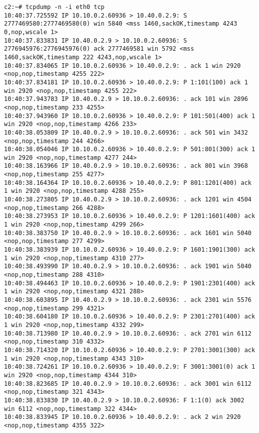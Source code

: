 \documentclass[a4paper,12pt]{article}
\begin{document}
\begin{Verbatim}
c2:~# tcpdump -n -i eth0 tcp
10:40:37.725592 IP 10.10.0.2.60936 > 10.40.0.2.9: S 2777469580:2777469580(0) win 5840 <mss 1460,sackOK,timestamp 4243 0,nop,wscale 1>
10:40:37.833831 IP 10.40.0.2.9 > 10.10.0.2.60936: S 2776945976:2776945976(0) ack 2777469581 win 5792 <mss 1460,sackOK,timestamp 222 4243,nop,wscale 1>
10:40:37.834065 IP 10.10.0.2.60936 > 10.40.0.2.9: . ack 1 win 2920 <nop,nop,timestamp 4255 222>
10:40:37.834181 IP 10.10.0.2.60936 > 10.40.0.2.9: P 1:101(100) ack 1 win 2920 <nop,nop,timestamp 4255 222>
10:40:37.943783 IP 10.40.0.2.9 > 10.10.0.2.60936: . ack 101 win 2896 <nop,nop,timestamp 233 4255>
10:40:37.943960 IP 10.10.0.2.60936 > 10.40.0.2.9: P 101:501(400) ack 1 win 2920 <nop,nop,timestamp 4266 233>
10:40:38.053809 IP 10.40.0.2.9 > 10.10.0.2.60936: . ack 501 win 3432 <nop,nop,timestamp 244 4266>
10:40:38.054046 IP 10.10.0.2.60936 > 10.40.0.2.9: P 501:801(300) ack 1 win 2920 <nop,nop,timestamp 4277 244>
10:40:38.163966 IP 10.40.0.2.9 > 10.10.0.2.60936: . ack 801 win 3968 <nop,nop,timestamp 255 4277>
10:40:38.164364 IP 10.10.0.2.60936 > 10.40.0.2.9: P 801:1201(400) ack 1 win 2920 <nop,nop,timestamp 4288 255>
10:40:38.273805 IP 10.40.0.2.9 > 10.10.0.2.60936: . ack 1201 win 4504 <nop,nop,timestamp 266 4288>
10:40:38.273953 IP 10.10.0.2.60936 > 10.40.0.2.9: P 1201:1601(400) ack 1 win 2920 <nop,nop,timestamp 4299 266>
10:40:38.383750 IP 10.40.0.2.9 > 10.10.0.2.60936: . ack 1601 win 5040 <nop,nop,timestamp 277 4299>
10:40:38.383939 IP 10.10.0.2.60936 > 10.40.0.2.9: P 1601:1901(300) ack 1 win 2920 <nop,nop,timestamp 4310 277>
10:40:38.493990 IP 10.40.0.2.9 > 10.10.0.2.60936: . ack 1901 win 5040 <nop,nop,timestamp 288 4310>
10:40:38.494463 IP 10.10.0.2.60936 > 10.40.0.2.9: P 1901:2301(400) ack 1 win 2920 <nop,nop,timestamp 4321 288>
10:40:38.603895 IP 10.40.0.2.9 > 10.10.0.2.60936: . ack 2301 win 5576 <nop,nop,timestamp 299 4321>
10:40:38.604180 IP 10.10.0.2.60936 > 10.40.0.2.9: P 2301:2701(400) ack 1 win 2920 <nop,nop,timestamp 4332 299>
10:40:38.713980 IP 10.40.0.2.9 > 10.10.0.2.60936: . ack 2701 win 6112 <nop,nop,timestamp 310 4332>
10:40:38.714320 IP 10.10.0.2.60936 > 10.40.0.2.9: P 2701:3001(300) ack 1 win 2920 <nop,nop,timestamp 4343 310>
10:40:38.724261 IP 10.10.0.2.60936 > 10.40.0.2.9: F 3001:3001(0) ack 1 win 2920 <nop,nop,timestamp 4344 310>
10:40:38.823685 IP 10.40.0.2.9 > 10.10.0.2.60936: . ack 3001 win 6112 <nop,nop,timestamp 321 4343>
10:40:38.833830 IP 10.40.0.2.9 > 10.10.0.2.60936: F 1:1(0) ack 3002 win 6112 <nop,nop,timestamp 322 4344>
10:40:38.833945 IP 10.10.0.2.60936 > 10.40.0.2.9: . ack 2 win 2920 <nop,nop,timestamp 4355 322>
\end{Verbatim}
\end{document}
